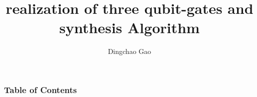 \documentclass[aspectratio=1610]{beamer}
\title[gates \& synthesis]{realization of three qubit-gates and synthesis Algorithm}
\author[Gcc]{Dingchao Gao}
\institute[ISCAS]{Institute of Software Chinese Academy of Sciences}
\begin{document}
\frame{\titlepage}

\begin{frame}
\frametitle{Table of Contents}
\tableofcontents[hideallsubsections]
\end{frame}



\end{document}
